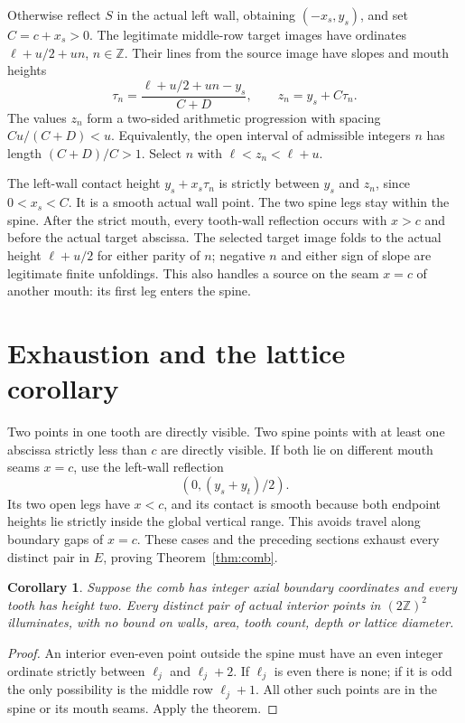 \documentclass[11pt]{article}
\newtheorem{corollary}[theorem]{Corollary}
\theoremstyle{definition}
\newcommand{\Z}{\mathbb Z}
\begin{document}
Otherwise reflect $S$ in the actual left wall, obtaining $(-x_s,y_s)$, and set $C=c+x_s>0$. The legitimate middle-row target images have ordinates $\ell+u/2+un$, $n\in\Z$. Their lines from the source image have slopes and mouth heights
\[
 \tau_n=\frac{\ell+u/2+un-y_s}{C+D},\qquad z_n=y_s+C\tau_n.
\]
The values $z_n$ form a two-sided arithmetic progression with spacing $Cu/(C+D)<u$. Equivalently, the open interval of admissible integers $n$ has length $(C+D)/C>1$. Select $n$ with $\ell<z_n<\ell+u$.

The left-wall contact height $y_s+x_s\tau_n$ is strictly between $y_s$ and $z_n$, since $0<x_s<C$. It is a smooth actual wall point. The two spine legs stay within the spine. After the strict mouth, every tooth-wall reflection occurs with $x>c$ and before the actual target abscissa. The selected target image folds to the actual height $\ell+u/2$ for either parity of $n$; negative $n$ and either sign of slope are legitimate finite unfoldings. This also handles a source on the seam $x=c$ of another mouth: its first leg enters the spine.

\section{Exhaustion and the lattice corollary}
Two points in one tooth are directly visible. Two spine points with at least one abscissa strictly less than $c$ are directly visible. If both lie on different mouth seams $x=c$, use the left-wall reflection
\[
 (0,(y_s+y_t)/2).
\]
Its two open legs have $x<c$, and its contact is smooth because both endpoint heights lie strictly inside the global vertical range. This avoids travel along boundary gaps of $x=c$. These cases and the preceding sections exhaust every distinct pair in $E$, proving Theorem~\ref{thm:comb}.

\begin{corollary}
Suppose the comb has integer axial boundary coordinates and every tooth has height two. Every distinct pair of actual interior points in $(2\Z)^2$ illuminates, with no bound on walls, area, tooth count, depth or lattice diameter.
\end{corollary}
\begin{proof}
An interior even-even point outside the spine must have an even integer ordinate strictly between $\ell_j$ and $\ell_j+2$. If $\ell_j$ is even there is none; if it is odd the only possibility is the middle row $\ell_j+1$. All other such points are in the spine or its mouth seams. Apply the theorem.
\end{proof}
\end{document}
